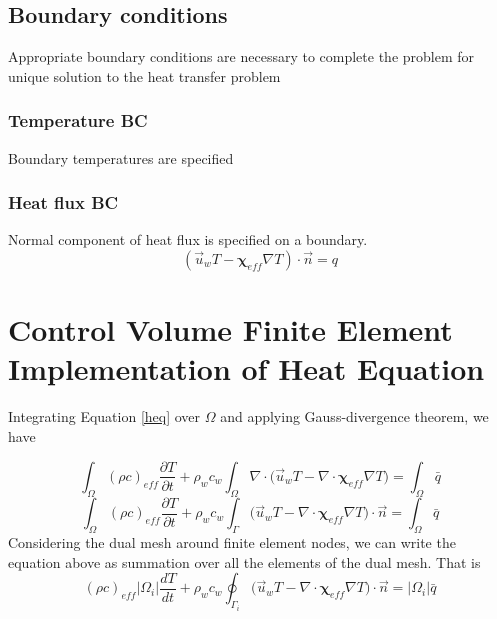\documentclass[12pt]{article}
\begin{document}
\subsection{Boundary conditions}
Appropriate boundary conditions are necessary to complete the problem for unique solution to the heat transfer problem
\subsubsection{Temperature BC}
Boundary temperatures are specified
\subsubsection{Heat flux BC}
Normal component of heat flux is specified on a boundary. 
\begin{equation}
(\vec{u}_wT-\mathbf{\chi}_{eff}\nabla T)\cdot\vec{n}=q
\end{equation}


\section{Control Volume Finite Element Implementation of Heat Equation}

Integrating Equation \ref{heq} over $\Omega$ and applying Gauss-divergence theorem, we have

\begin{equation}	\label{heq1}
\int_{\Omega}(\rho c )_{eff}\frac{\partial T}{\partial t} + \rho_wc_w\int_{\Omega}\nabla\cdot\big(\vec{u}_w T-\nabla\cdot\mathbf{\chi}_{eff}\nabla T\big)=\int_{\Omega}\bar{q}
\end{equation}
%
\begin{equation}	\label{heq2}
\int_{\Omega}(\rho c )_{eff}\frac{\partial T}{\partial t} + \rho_wc_w\int_{\Gamma}\big(\vec{u}_w T-\nabla\cdot\mathbf{\chi}_{eff}\nabla T\big)\cdot\vec{n}=\int_{\Omega}\bar{q}
\end{equation}
%
Considering the dual mesh around finite element nodes, we can write the equation above as summation over all the  elements of the dual mesh. That is
%
\begin{equation}	\label{heq2}
(\rho c )_{eff}|\Omega_i|\frac{d T}{d t} + \rho_wc_w\oint_{\Gamma_i}\big(\vec{u}_w T-\nabla\cdot\mathbf{\chi}_{eff}\nabla T\big)\cdot\vec{n}=|\Omega_i|\bar{q}
\end{equation}
\end{document}
